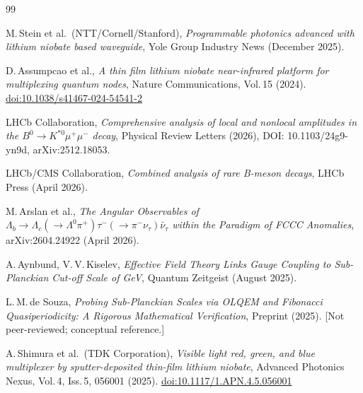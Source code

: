 \begin{thebibliography}{99}

M.\,Stein et al.\ (NTT/Cornell/Stanford),
\textit{Programmable photonics advanced with lithium niobate based waveguide},
Yole Group Industry News (December 2025).

D.\,Assumpcao et al.,
\textit{A thin film lithium niobate near-infrared platform for multiplexing quantum nodes},
Nature Communications, Vol.\,15 (2024).
\href{https://doi.org/10.1038/s41467-024-54541-2}{doi:10.1038/s41467-024-54541-2}

LHCb Collaboration,
\textit{Comprehensive analysis of local and nonlocal amplitudes in the
$B^0 \to K^{*0}\mu^+\mu^-$ decay},
Physical Review Letters (2026),
DOI: 10.1103/24g9-yn9d,
arXiv:2512.18053.

LHCb/CMS Collaboration,
\textit{Combined analysis of rare B-meson decays},
LHCb Press (April 2026).

M.\,Arslan et al.,
\textit{The Angular Observables of $\Lambda_b \to \Lambda_c(\to \Lambda^0\pi^+)
\tau^-(\to\pi^-\nu_\tau)\bar{\nu}_\tau$ within the Paradigm of FCCC Anomalies},
arXiv:2604.24922 (April 2026).

A.\,Aynbund, V.\,V.\,Kiselev,
\textit{Effective Field Theory Links Gauge Coupling to Sub-Planckian Cut-off Scale of GeV},
Quantum Zeitgeist (August 2025).

L.\,M.\,de Souza,
\textit{Probing Sub-Planckian Scales via OLQEM and Fibonacci Quasiperiodicity:
A Rigorous Mathematical Verification},
Preprint (2025). [Not peer-reviewed; conceptual reference.]

A.\,Shimura et al.\ (TDK Corporation),
\textit{Visible light red, green, and blue multiplexer by sputter-deposited
thin-film lithium niobate},
Advanced Photonics Nexus, Vol.\,4, Iss.\,5, 056001 (2025).
\href{https://doi.org/10.1117/1.APN.4.5.056001}{doi:10.1117/1.APN.4.5.056001}

\end{thebibliography}
